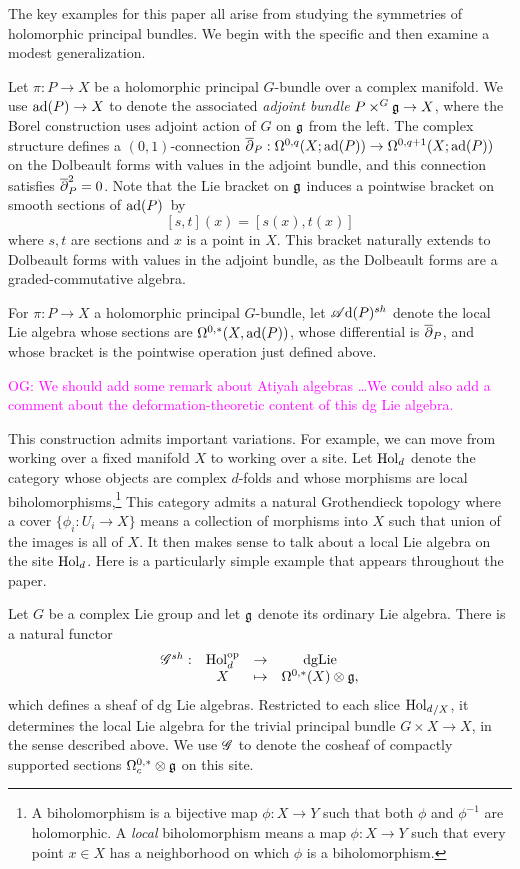 \documentclass[10pt]{amsart}
\def\sAd{\sA{\rm d}}
\def\owen{\textcolor{magenta}{OG: }\textcolor{magenta}}
\def\opp{{\rm op}}
\def\dgLie{{\rm dgLie}}
\begin{document}
The key examples for this paper all arise from studying the symmetries of holomorphic principal bundles.
We begin with the specific and then examine a modest generalization.

Let $\pi : P \to X$ be a holomorphic principal $G$-bundle over a complex manifold.
We use ${\rm ad}(P) \to X$ to denote the associated {\em adjoint bundle} $P \times^{G} \mathfrak g \to X$, 
where the Borel construction uses adjoint action of $G$ on $\mathfrak g$ from the left. 
The complex structure defines a $(0,1)$-connection $\overline{\partial}_P : \Omega^{0,q}(X ; {\rm ad}(P)) \to \Omega^{0,q+1}(X ; {\rm ad}(P))$
on the Dolbeault forms with values in the adjoint bundle,
and this connection satisfies $\overline{\partial}_P^2 = 0$.
Note that the Lie bracket on $\mathfrak g$ induces a pointwise bracket on smooth sections of ${\rm ad}(P)$~by
\[
[s,t](x) = [s(x),t(x)]
\]
where $s, t$ are sections and $x$ is a point in $X$.
This bracket naturally extends to Dolbeault forms with values in the adjoint bundle,
as the Dolbeault forms are a graded-commutative algebra.

\begin{dfn}
For $\pi : P \to X$ a holomorphic principal $G$-bundle,
let $\sAd(P)^{sh}$ denote the local Lie algebra whose sections are $\Omega^{0,*}(X,{\rm ad}(P))$,
whose differential is $\overline{\partial}_P$, and whose bracket is the pointwise operation just defined above.
\end{dfn}

\owen{We should add some remark about Atiyah algebras \dots We could also add a comment about the deformation-theoretic content of this dg Lie algebra.}

This construction admits important variations.
For example, we can move from working over a fixed manifold $X$ to working over a site.
Let ${\rm Hol}_d$ denote the category whose objects are complex $d$-folds and whose morphisms are local biholomorphisms,\footnote{A biholomorphism is a bijective map $\phi: X \to Y$ such that both $\phi$ and $\phi^{-1}$ are holomorphic. A {\em local} biholomorphism means a map $\phi: X \to Y$ such that every point $x \in X$ has a neighborhood on which $\phi$ is a biholomorphism.}
This category admits a natural Grothendieck topology where a cover $\{\phi_i: U_i \to X\}$ means a collection of morphisms into $X$ such that union of the images is all of $X$.
It then makes sense to talk about a local Lie algebra on the site ${\rm Hol}_d$.
Here is a particularly simple example that appears throughout the paper.

\begin{dfn}
Let $G$ be a complex Lie group and let $\mathfrak g$ denote its ordinary Lie algebra.
There is a natural functor 
\[
\begin{array}{cccc}
\sG^{sh} :&  {\rm Hol}_d^\opp & \to & {\dgLie}\\
& X & \mapsto &\Omega^{0,*}(X) \otimes \fg,
\end{array}
\]
which defines a sheaf of dg Lie algebras.
Restricted to each slice ${{\rm Hol}_d}_{/X}$, it determines the local Lie algebra for the trivial principal bundle $G \times X \to X$, in the sense described above.
We use $\mathscr G$ to denote the cosheaf of compactly supported sections $\Omega^{0,*}_c \otimes \mathfrak g$ on this site.
\end{dfn}
\end{document}
